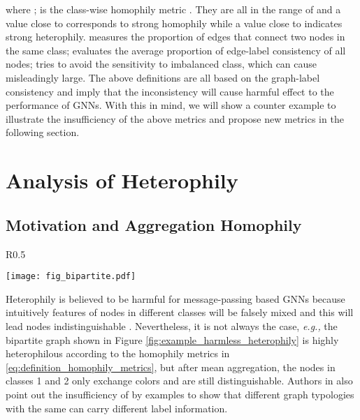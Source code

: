 \documentclass{article}
\newcommand\eg{\textit{e.g.,}}
\newcommand{\0}{{\boldsymbol{0}}}
\newcommand{\6}{{\partial}}
\newcommand{\8}{{\infty}}
\newcommand{\4}{{\nabla}}
\begin{document}
where ;  is the class-wise homophily metric \cite{lim2021new}. They are all in the range of  and a value close to  corresponds to strong homophily while a value close to  indicates strong heterophily.  measures the proportion of edges that connect two nodes in the same class;  evaluates the average proportion of edge-label consistency of all nodes;  tries to avoid the sensitivity to imbalanced class, which can cause  misleadingly large. The above definitions are all based on the graph-label consistency and imply that the inconsistency will cause harmful effect to the performance of GNNs. With this in mind, we will show a counter example to illustrate the insufficiency of the above metrics and propose new metrics in the following section.











\section{Analysis of Heterophily}
\label{sec:heterophily_analysis}
\subsection{Motivation and Aggregation Homophily}
\begin{wrapfigure}{R}{0.5\textwidth}
  \begin{center}
    \texttt{[image: fig\_bipartite.pdf]}
  \end{center}
  \caption{Example of harmless heterophily}
  \label{fig:example_harmless_heterophily}
\end{wrapfigure}

Heterophily is believed to be harmful for message-passing based GNNs \cite{zhu2020beyond,pei2020geom,chien2021adaptive} because intuitively features of nodes in different classes will be falsely mixed and this will lead nodes indistinguishable \cite{zhu2020beyond}.
Nevertheless, it is not always the case, \eg{} the bipartite graph shown in Figure \ref{fig:example_harmless_heterophily} is highly heterophilous according to the homophily metrics in \eqref{eq:definition_homophily_metrics}, but after mean aggregation, the nodes in classes 1 and 2 only exchange colors and are still distinguishable. Authors in \cite{chien2021adaptive} also point out the insufficiency of  by examples to show that different graph typologies with the same  can carry different label information. 
\end{document}
